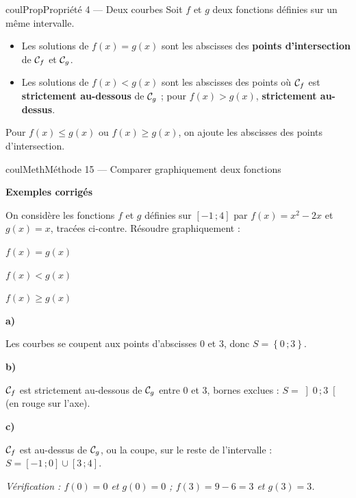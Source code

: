 \documentclass[11pt,a4paper]{article}
\makeatletter
\renewcommand{\le}{\leqslant}
\renewcommand{\ge}{\geqslant}
\newcommand{\lycee@repere}[4]{%
  \draw[grille,step=1] (#1,#2) grid (#3,#4);
  \draw[-{Stealth[length=2mm]},thick] (#1,0)--({#3+0.4},0) node[below left=-1pt]{$x$};
  \draw[-{Stealth[length=2mm]},thick] (0,#2)--(0,{#4+0.4}) node[below left=-1pt]{$y$};
  \node[below left,font=\scriptsize,inner sep=1.5pt] at (0,0) {$0$};}
\newcommand{\lycee@gradx}[1]{\foreach \k/\l in {#1}{%
  \draw (\k,0.07)--(\k,-0.07) node[below,font=\scriptsize,inner sep=1.5pt]{$\l$};}}
\newcommand{\lycee@grady}[1]{\foreach \k/\l in {#1}{%
  \draw (0.07,\k)--(-0.07,\k) node[left,font=\scriptsize,inner sep=1.5pt]{$\l$};}}
\newcommand{\lycee@intff}[2]{\left[#1\,;#2\right]}
\newcommand{\lycee@intoo}[2]{\left]#1\,;#2\right[}
\newcommand{\lycee@ens}[1]{\left\{#1\right\}}
\providecommand{\repere}{\lycee@repere}%
\providecommand{\gradx}{\lycee@gradx}%
\providecommand{\grady}{\lycee@grady}%
\providecommand{\Cf}{\mathcal{C}\sb{f}}%
\providecommand{\Cg}{\mathcal{C}\sb{g}}%
\providecommand{\intff}{\lycee@intff}%
\providecommand{\intoo}{\lycee@intoo}%
\providecommand{\ens}{\lycee@ens}}
\newcounter{lycee@signet}
\newcommand{\signet}[3][]{\stepcounter{lycee@signet}%
  \edef\lycee@dest{\if\relax\detokenize{#1}\relax
    signet.\arabic{lycee@signet}\else#1\fi}%
  \hypertarget{\lycee@dest}{}\bookmark[level=#2,dest=\lycee@dest]{#3}}
\newcommand{\res}[1]{#1}
\newcounter{methode}
\newenvironment{proprietebox}[1][Propriété]%
  {\begin{boitecours}[phantom={\signet{2}{#1}}]{coulProp}{#1}}{\end{boitecours}}
\newenvironment{methodebox}[1][Méthode]{\stepcounter{methode}%
  \begin{boitecours}[phantom={\signet[methode-\arabic{methode}]{2}{#1}}]{coulMeth}{#1}}%
  {\end{boitecours}}
\newcommand{\etape}[1]{\par\smallskip\textbf{\color{coulMeth}#1}\par\nobreak\smallskip}
\newcommand{\cas}[1]{\par\smallskip\noindent\textbf{\color{coulExo}#1}\vadjust{\nobreak}}
\newenvironment{correction}{\par}{\par}
\newcommand{\etapeexemples}{\etape{Exemples corrigés}}
\makeatother
\begin{document}
\begin{proprietebox}[Propriété 4 --- Deux courbes]
Soit $f$ et $g$ deux fonctions définies sur un même intervalle.
\begin{itemize}
  \item Les solutions de $f(x)=g(x)$ sont les abscisses des \textbf{points
        d'intersection} de $\Cf$ et $\Cg$.
  \item Les solutions de $f(x)<g(x)$ sont les abscisses des points où $\Cf$ est
        \textbf{strictement au-dessous} de $\Cg$ ; pour $f(x)>g(x)$,
        \textbf{strictement au-dessus}.
\end{itemize}
Pour $f(x)\le g(x)$ ou $f(x)\ge g(x)$, on ajoute les abscisses des points
d'intersection.
\end{proprietebox}

\begin{methodebox}[Méthode 15 --- Comparer graphiquement deux fonctions]
\etapeexemples
On considère les fonctions $f$ et $g$ définies sur $\intff{-1}{4}$ par ${f(x)=x^{2}-2x}$ et
$g(x)=x$, tracées ci-contre.
Résoudre graphiquement :
\begin{questions}[label=\alph*)]
  \item $f(x)=g(x)$
  \item $f(x)<g(x)$
  \item $f(x)\ge g(x)$
\end{questions}
\begin{correction}
\begin{minipage}[t]{0.58\linewidth}\raggedright
\cas{a)}\par\nopagebreak
Les courbes se coupent aux points d'abscisses $0$ et $3$, donc ${S=\res{\ens{0\,;3}}}$.

\cas{b)}\par\nopagebreak
$\Cf$ est strictement au-dessous de $\Cg$ entre $0$ et $3$, bornes exclues :
${S=\res{\intoo{0}{3}}}$ (en rouge sur l'axe).

\cas{c)}\par\nopagebreak
$\Cf$ est au-dessus de $\Cg$, ou la coupe, sur le reste de l'intervalle :
${S=\res{\intff{-1}{0}\cup\intff{3}{4}}}$.

\smallskip
\emph{Vérification : $f(0)=0$ et $g(0)=0$ ; $f(3)=9-6=3$ et $g(3)=3$.}
\end{minipage}\hfill
\begin{minipage}[t]{0.38\linewidth}
\vspace{0pt}\centering
{}
\end{minipage}
\end{correction}


\end{methodebox}
\end{document}
